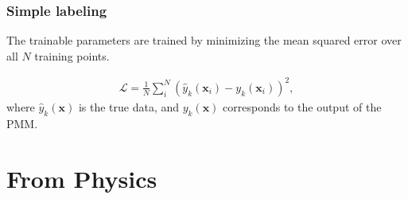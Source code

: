 \documentclass[11pt]{beamer} %
\begin{document}
\begin{frame}
\frametitle{Simple labeling}

The trainable parameters are trained by minimizing the mean squared
error over all $N$ training points.

\[
    \begin{aligned}
        \mathcal{L} = \frac{1}{N}\sum^N_i(\hat{y}_k(\mathbf{x}_i)-y_k(\mathbf{x}_i))^2,
    \end{aligned}
\]
where $\hat{y}_k(\mathbf{x})$ is the true data, and $y_k(\mathbf{x})$ corresponds to the output of the PMM.
\end{frame}



\section{From Physics}
\end{document}
